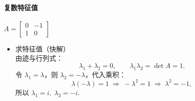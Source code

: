 \documentclass[12pt]{article}
\begin{document}
\paragraph{复数特征值}

\begin{flushleft}

    $A  = \begin{bmatrix}
            0 & -1 \\
            1 & 0
        \end{bmatrix}$
    \begin{itemize}
        \item 求特征值（快解） \\
              由迹与行列式：
              \[
                  \lambda_1 + \lambda_2 = 0,\qquad \lambda_1\lambda_2 = \det A = 1.
              \]
              令 $\lambda_1 = \lambda$，则 $\lambda_2 = -\lambda$，代入乘积：
              \[
                  \lambda(-\lambda) = 1 \;\Longrightarrow\; -\lambda^2 = 1 \;\Longrightarrow\; \lambda^2 = -1,
              \]
              所以 $\lambda_1 = i,\;\lambda_2 = -i$.


\end{itemize}
\end{flushleft}
\end{document}
